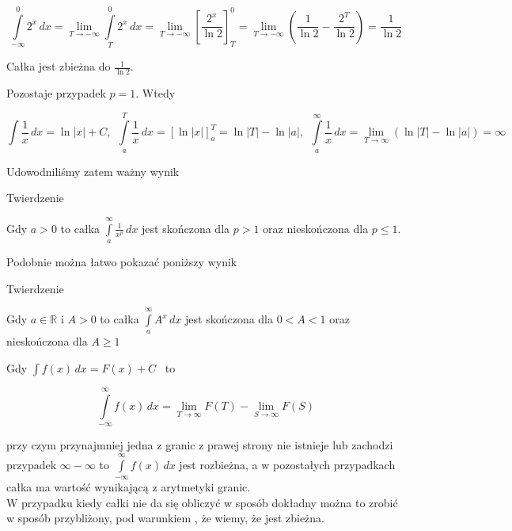 \begin{przyklad}
$$ \int\limits_{-\infty}^{0} 2^x \,dx = \lim_{T \to -\infty} \int\limits_{T}^{0} 2^x \,dx = 
\lim_{T \to -\infty} \left[ \frac{2^x}{\ln 2} \right]_T^0 = \lim_{T \to -\infty} 
\left( \frac{1}{\ln 2} - \frac{2^T}{\ln 2} \right) = \frac{1}{\ln 2} $$

Całka jest zbieżna do $ \frac{1}{\ln 2} $.

Pozostaje przypadek $ p = 1 $. Wtedy

$$ \int \frac{1}{x} \,dx = \ln |x| + C, \ \
\int\limits_{a}^{T} \frac{1}{x} \,dx = [\ln |x|]_a^T = \ln |T| - \ln |a|, \ \
\int\limits_{a}^{\infty} \frac{1}{x} \,dx = \lim_{T \to \infty} (\ln |T| - \ln |a|) = \infty $$

Udowodniliśmy zatem ważny wynik
\end{przyklad}

\begin{tw}{Twierdzenie} 

Gdy $ a > 0 $ to całka $ \int\limits_{a}^{\infty} \frac{1}{x^p} \,dx $
jest skończona dla $ p > 1 $ oraz nieskończona dla $ p \leq 1 $.

\end{tw}

Podobnie można łatwo pokazać poniższy wynik \\

\begin{tw}{Twierdzenie}

Gdy $ a \in \mathbb{R} $ i $ A > 0 $ to całka $ \int\limits_{a}^{\infty} A^x \,dx $
jest skończona dla $ 0 < A < 1 $ oraz nieskończona \linebreak dla $ A \geq 1 $ \\

\end{tw}

Gdy $ \int f(x) \,dx = F(x) + C $ \ to

$$ \int\limits_{-\infty}^{\infty} f(x) \, dx = \lim_{T \to \infty} F(T) - \lim_{S \to \infty} F(S) $$

przy czym przynajmniej jedna z granic z prawej strony nie istnieje lub zachodzi przypadek 
$ \infty - \infty $ to $ \int\limits_{-\infty}^{\infty} f(x) \,dx $ jest rozbieżna, a w pozostałych
przypadkach całka ma wartość wynikającą z arytmetyki granic. \\

W przypadku kiedy całki nie da się obliczyć w sposób dokładny można to zrobić w sposób przybliżony, pod warunkiem
, że wiemy, że jest zbieżna.

